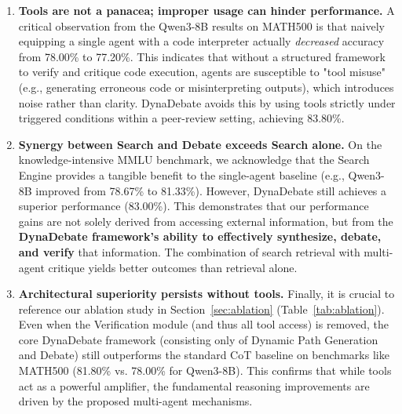 \begin{enumerate}
    \item \textbf{Tools are not a panacea; improper usage can hinder performance.}
    A critical observation from the Qwen3-8B results on MATH500 is that naively equipping a single agent with a code interpreter actually \textit{decreased} accuracy from 78.00\% to 77.20\%. This indicates that without a structured framework to verify and critique code execution, agents are susceptible to "tool misuse" (e.g., generating erroneous code or misinterpreting outputs), which introduces noise rather than clarity. DynaDebate avoids this by using tools strictly under triggered conditions within a peer-review setting, achieving 83.80\%.

    \item \textbf{Synergy between Search and Debate exceeds Search alone.}
    On the knowledge-intensive MMLU benchmark, we acknowledge that the Search Engine provides a tangible benefit to the single-agent baseline (e.g., Qwen3-8B improved from 78.67\% to 81.33\%). However, DynaDebate still achieves a superior performance (83.00\%). This demonstrates that our performance gains are not solely derived from accessing external information, but from the \textbf{DynaDebate framework's ability to effectively synthesize, debate, and verify} that information. The combination of search retrieval with multi-agent critique yields better outcomes than retrieval alone.

    \item \textbf{Architectural superiority persists without tools.}
    Finally, it is crucial to reference our ablation study in Section~\ref{sec:ablation} (Table~\ref{tab:ablation}). Even when the Verification module (and thus all tool access) is removed, the core DynaDebate framework (consisting only of Dynamic Path Generation and Debate) still outperforms the standard CoT baseline on benchmarks like MATH500 (81.80\% vs. 78.00\% for Qwen3-8B). This confirms that while tools act as a powerful amplifier, the fundamental reasoning improvements are driven by the proposed multi-agent mechanisms.
\end{enumerate}
